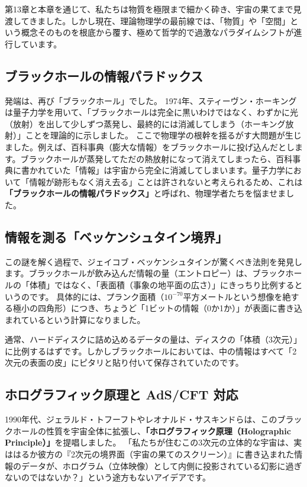 第13章と本章を通じて、私たちは物質を極限まで細かく砕き、宇宙の果てまで見渡してきました。しかし現在、理論物理学の最前線では、「物質」や「空間」という概念そのものを根底から覆す、極めて哲学的で過激なパラダイムシフトが進行しています。

\subsection{ブラックホールの情報パラドックス}

発端は、再び「ブラックホール」でした。 1974年、スティーヴン・ホーキングは量子力学を用いて、「ブラックホールは完全に黒いわけではなく、わずかに光（放射）を出して少しずつ蒸発し、最終的には消滅してしまう（ホーキング放射）」ことを理論的に示しました。 ここで物理学の根幹を揺るがす大問題が生じました。例えば、百科事典（膨大な情報）をブラックホールに投げ込んだとします。ブラックホールが蒸発してただの熱放射になって消えてしまったら、百科事典に書かれていた「情報」は宇宙から完全に消滅してしまいます。量子力学において「情報が跡形もなく消え去る」ことは許されないと考えられるため、これは\textbf{「ブラックホールの情報パラドックス」}と呼ばれ、物理学者たちを悩ませました。

\subsection{情報を測る「ベッケンシュタイン境界」}

この謎を解く過程で、ジェイコブ・ベッケンシュタインが驚くべき法則を発見します。ブラックホールが飲み込んだ情報の量（エントロピー）は、ブラックホールの「体積」ではなく、「表面積（事象の地平面の広さ）」にきっちり比例するというのです。 具体的には、プランク面積（\(10^{-70}\)平方メートルという想像を絶する極小の四角形）につき、ちょうど「1ビットの情報（0か1か）」が表面に書き込まれているという計算になりました。

通常、ハードディスクに詰め込めるデータの量は、ディスクの「体積（3次元）」に比例するはずです。しかしブラックホールにおいては、中の情報はすべて「2次元の表面の皮」にピタリと貼り付いて保存されていたのです。

\subsection{ホログラフィック原理と AdS/CFT 対応}

1990年代、ジェラルド・トフーフトやレオナルド・サスキンドらは、このブラックホールの性質を宇宙全体に拡張し、\textbf{「ホログラフィック原理（Holographic Principle）」}を提唱しました。 「私たちが住むこの3次元の立体的な宇宙は、実ははるか彼方の『2次元の境界面（宇宙の果てのスクリーン）』に書き込まれた情報のデータが、ホログラム（立体映像）として内側に投影されている幻影に過ぎないのではないか？」という途方もないアイデアです。

